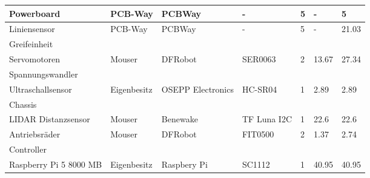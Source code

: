 \documentclass[main.tex]{subfiles} %
\begin{document}
\begin{table}[htbp]
{\begin{tabular}{|p{3cm}|p{2.5cm}|p{2.5cm}|p{3cm}|p{1cm}|p{1.5cm}|p{1cm}|}
            Powerboard                              & PCB-Way            & PCBWay                       & -                       & 5               & -                         & 5                           \\ \hline
            Liniensensor                            & PCB-Way            & PCBWay                       & -                       & 5               & -                         & 21.03                       \\ \hline
            \rowcolor{lightgray} Greifeinheit       &                    &                              &                         &                 &                           &                             \\ \hline
            Servomotoren                            & Mouser             & DFRobot                      & SER0063                 & 2               & 13.67                     & 27.34                       \\ \hline
            Spannungswandler                        &                    &                              &                         &                 &                           &                           \\ \hline
            Ultraschallsensor                       & Eigenbesitz        & OSEPP Electronics            & HC-SR04                 & 1               & 2.89                      & 2.89                        \\ \hline
            \rowcolor{lightgray} Chassis            &                    &                              &                         &                 &                           &                             \\ \hline
            LIDAR Distanzsensor                     & Mouser             & Benewake                     & TF Luna I2C             & 1               & 22.6                      & 22.6                        \\ \hline
            Antriebsräder                           & Mouser             & DFRobot                      & FIT0500                 & 2               & 1.37                      & 2.74                        \\ \hline
            \rowcolor{lightgray} Controller         &                    &                              &                         &                 &                           &                             \\ \hline
            Raspberry Pi 5 8000 MB                  & Eigenbesitz        & Raspbery Pi                  & SC1112                  & 1               & 40.95                     & 40.95                       \\ \hline

\end{tabular}}
\end{table}
\end{document}
